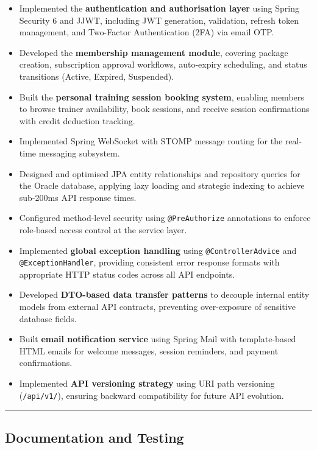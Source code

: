 \documentclass[
  12pt,
  a4paperpaper,
]{report}
\providecommand{\tightlist}{%
  \setlength{\itemsep}{0pt}\setlength{\parskip}{0pt}}
\begin{document}
\begin{itemize}
\tightlist
\item
  Implemented the \textbf{authentication and authorisation layer} using
  Spring Security 6 and JJWT, including JWT generation, validation,
  refresh token management, and Two-Factor Authentication (2FA) via
  email OTP.
\item
  Developed the \textbf{membership management module}, covering package
  creation, subscription approval workflows, auto-expiry scheduling, and
  status transitions (Active, Expired, Suspended).
\item
  Built the \textbf{personal training session booking system}, enabling
  members to browse trainer availability, book sessions, and receive
  session confirmations with credit deduction tracking.
\item
  Implemented Spring WebSocket with STOMP message routing for the
  real-time messaging subsystem.
\item
  Designed and optimised JPA entity relationships and repository queries
  for the Oracle database, applying lazy loading and strategic indexing
  to achieve sub-200ms API response times.
\item
  Configured method-level security using \texttt{@PreAuthorize}
  annotations to enforce role-based access control at the service layer.
\item
  Implemented \textbf{global exception handling} using
  \texttt{@ControllerAdvice} and \texttt{@ExceptionHandler}, providing
  consistent error response formats with appropriate HTTP status codes
  across all API endpoints.
\item
  Developed \textbf{DTO-based data transfer patterns} to decouple
  internal entity models from external API contracts, preventing
  over-exposure of sensitive database fields.
\item
  Built \textbf{email notification service} using Spring Mail with
  template-based HTML emails for welcome messages, session reminders,
  and payment confirmations.
\item
  Implemented \textbf{API versioning strategy} using URI path
  versioning (\texttt{/api/v1/}), ensuring backward compatibility for
  future API evolution.
\end{itemize}

\medskip\noindent

\rule{\textwidth}{0.3pt}

\subsection{Documentation and Testing}\label{documentation-and-testing}
\end{document}
